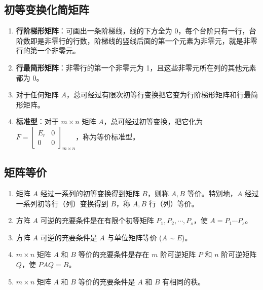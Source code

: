 \documentclass[UTF8]{ctexart}
\theoremstyle{mydef}
\begin{document}
\subsection{初等变换化简矩阵}
\begin{enumerate}
    \item \textbf{行阶梯形矩阵}：可画出一条阶梯线，线的下方全为 0，每个台阶只有一行，台阶数即是非零行的行数，阶梯线的竖线后面的第一个元素为非零元，就是非零行的第一个非零元。
    \item \textbf{行最简形矩阵}：非零行的第一个非零元为 1，且这些非零元所在列的其他元素都为 0。
    \item 对于任何矩阵 $A$，总可经过有限次初等行变换把它变为行阶梯形矩阵和行最简形矩阵。
    \item \textbf{标准型}：对于 $m \times n$ 矩阵 $A$，总可经过初等变换，把它化为 $F = \begin{bmatrix} E_r & 0 \\ 0 & 0 \end{bmatrix}_{m \times n}$，称为等价标准型。
\end{enumerate}

\subsection{矩阵等价}
\begin{enumerate}
    \item 矩阵 $A$ 经过一系列的初等变换得到矩阵 $B$，则称 $A, B$ 等价。特别地，$A$ 经过一系列初等行（列）变换得到 $B$，称 $A, B$ 行（列）等价。
    \item 方阵 $A$ 可逆的充要条件是在有限个初等矩阵 $P_1, P_2, \cdots, P_s$，使 $A = P_1 \cdots P_s$。
    \item 方阵 $A$ 可逆的充要条件是 $A$ 与单位矩阵等价 ($A \sim E$)。
    \item $m \times n$ 矩阵 $A$ 和 $B$ 等价的充要条件是存在 $m$ 阶可逆矩阵 $P$ 和 $n$ 阶可逆矩阵 $Q$，使 $PAQ = B$。
    \item $m \times n$ 矩阵 $A$ 和 $B$ 等价的充要条件是 $A$ 和 $B$ 有相同的秩。
\end{enumerate}
\end{document}
